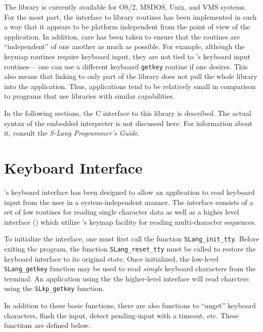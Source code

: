   The library is currently available for OS/2, MSDOS, Unix, and VMS
  systems.  For the most part, the interface to library routines has
  been implemented in such a way that it appears to be platform
  independent from the point of view of the application.  In addition,
  care has been taken to ensure that the routines are ``independent''
  of one another as much as possible.  For example, although the
  keymap routines require keyboard input, they are not tied to
  \slang's keyboard input routines--- one can use a different keyboard
  \verb|getkey| routine if one desires.  This also means that linking
  to only part of the \slang{} library does not pull the whole library
  into the application.  Thus, \slang{} applications tend to be
  relatively small in comparison to programs that use libraries with
  similar capabilities.

  In the following sections, the C interface to this library is described.
  The actual syntax of the embedded \slang{} interpreter is not discussed
  here.  For information about it, consult the {\em S-Lang Programmer's
  Guide}.


\section{Keyboard Interface} %


  \slang's keyboard interface has been designed to allow an
  application to read keyboard input from the user in a
  system-independent manner.  The interface consists of a set of low
  routines for reading single character data as well as a higher
  level interface () which utilize \slang's keymap facility
  for reading multi-character sequences.

  To initialize the interface, one must first call the function
  \verb|SLang_init_tty|. Before exiting the program, the function
  \verb|SLang_reset_tty| must be called to restore the keyboard
  interface to its original state.  Once initialized, the low-level
  \verb|SLang_getkey| function may be used to read {\em simgle}
  keyboard characters from the terminal.  An application using the the
  higher-level  interface will read charcters using the
  \verb|SLkp_getkey| function.

  In addition to these basic functions, there are also functions to
  ``unget'' keyboard characters, flush the input, detect pending-input
  with a timeout, etc. These functions are defined below.

